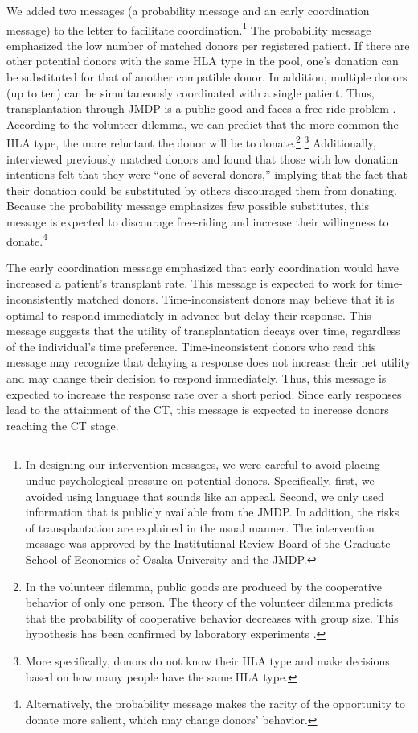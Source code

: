 \documentclass[12pt, a4paper]{article}
\begin{document}
We added two messages (a probability message and an early coordination message) to the letter to facilitate coordination.\footnote{In designing our intervention messages, we were careful to avoid placing undue psychological pressure on potential donors. Specifically, first, we avoided using language that sounds like an appeal. Second, we only used information that is publicly available from the JMDP. In addition, the risks of transplantation are explained in the usual manner. The intervention message was approved by the Institutional Review Board of the Graduate School of Economics of Osaka University and the JMDP.} The probability message emphasized the low number of matched donors per registered patient. If there are other potential donors with the same HLA type in the pool, one's donation can be substituted for that of another compatible donor. In addition, multiple donors (up to ten) can be simultaneously coordinated with a single patient. Thus, transplantation through JMDP is a public good and faces a free-ride problem \citep{Bergstrom2009}. According to the volunteer dilemma, we can predict that the more common the HLA type, the more reluctant the donor will be to donate.\footnote{In the volunteer dilemma, public goods are produced by the cooperative behavior of only one person. The theory of the volunteer dilemma predicts that the probability of cooperative behavior decreases with group size. This hypothesis has been confirmed by laboratory experiments \citep{Diekmann1985, Diekmann1986, Goeree2017}.} \footnote{More specifically, donors do not know their HLA type and make decisions based on how many people have the same HLA type.} Additionally, \citet{Kurosawa2022} interviewed previously matched donors and found that those with low donation intentions felt that they were ``one of several donors,'' implying that the fact that their donation could be substituted by others discouraged them from donating. Because the probability message emphasizes few possible substitutes, this message is expected to discourage free-riding and increase their willingness to donate.\footnote{Alternatively, the probability message makes the rarity of the opportunity to donate more salient, which may change donors' behavior.}

The early coordination message emphasized that early coordination would have increased a patient's transplant rate. This message is expected to work for time-inconsistently matched donors. Time-inconsistent donors may believe that it is optimal to respond immediately in advance but delay their response. This message suggests that the utility of transplantation decays over time, regardless of the individual's time preference. Time-inconsistent donors who read this message may recognize that delaying a response does not increase their net utility and may change their decision to respond immediately. Thus, this message is expected to increase the response rate over a short period. Since early responses lead to the attainment of the CT, this message is expected to increase donors reaching the CT stage.
\end{document}
